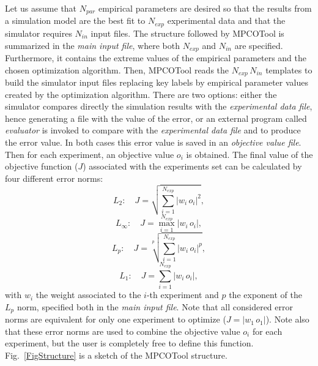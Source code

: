 \documentclass[review,authoryear]{elsarticle}
\newcommand{\EQ}[2]
{\begin{equation}#1\label{#2}\end{equation}}
\newcommand{\PSPICTURE}[7]
{
	\begin{figure}[ht!]
		\centering
		\pspicture(#1,#2)(#3,#4)
			#5
		\endpspicture
		\caption{#6.\label{#7}}
	\end{figure}
}
\newcommand{\ABS}[1]{\left|#1\right|}
\begin{document}
Let us assume that $N_{par}$ empirical parameters are desired so
that the results from a simulation model are the best fit to $N_{exp}$
experimental data and that the simulator requires $N_{in}$ input files. The
structure followed by MPCOTool is summarized in the \emph{main input file},
where both $N_{exp}$ and $N_{in}$ are specified. Furthermore, it
contains the extreme values of the empirical parameters and the chosen
optimization algorithm. Then, MPCOTool reads the
$N_{exp}\,N_{in}$ templates to build the simulator input files
replacing key labels by empirical parameter values created by the optimization
algorithm. There are two options: either the simulator compares directly the
simulation results with the \emph{experimental data file}, hence generating a
file with the value of the error, or an external program called \emph{evaluator}
is invoked to compare with the \emph{experimental data file} and to produce the
error value. In both cases this error value is saved in an
\emph{objective value file}. Then for each experiment, an objective value $o_i$
is obtained. The final value of the objective function ($J$) associated with the
experiments set can be calculated by four different error norms:
\EQ{L_2:\quad J=\sqrt{\sum_{i=1}^{N_{exp}}\ABS{w_i\,o_i}^2},}
{EqObjectiveFunctionLII}
\EQ{L_\infty:\quad J=\max_{i=1}^{N_{exp}}\ABS{w_i\,o_i},}
{EqObjectiveFunctionLi}
\EQ{L_p:\quad J=\sqrt[p]{\sum_{i=1}^{N_{exp}}\ABS{w_i\,o_i}^p},}
{EqObjectiveFunctionLp}
\EQ{L_1:\quad J=\sum_{i=1}^{N_{exp}}\ABS{w_i\,o_i},}
{EqObjectiveFunctionLI}
with $w_i$ the weight associated to the $i$-th experiment and $p$ the exponent
of the $L_p$ norm, specified both in the \emph{main input file}.
Note that all considered error norms are equivalent for only one experiment to
optimize ($J=\ABS{w_1\,o_1}$).
Note also that these error norms are used to combine the objective value $o_i$
for each experiment, but the user is completely free to define this function.
Fig.~\ref{FigStructure} is a sketch of the MPCOTool structure.
\end{document}
